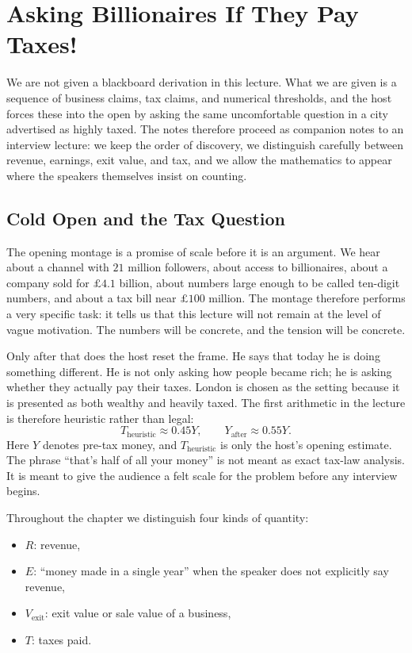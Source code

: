 \chapter{Asking Billionaires If They Pay Taxes!}

We are not given a blackboard derivation in this lecture. What we are given is a sequence of business claims, tax claims, and numerical thresholds, and the host forces these into the open by asking the same uncomfortable question in a city advertised as highly taxed. The notes therefore proceed as companion notes to an interview lecture: we keep the order of discovery, we distinguish carefully between revenue, earnings, exit value, and tax, and we allow the mathematics to appear where the speakers themselves insist on counting.

\section{Cold Open and the Tax Question}

The opening montage is a promise of scale before it is an argument. We hear about a channel with \(21\) million followers, about access to billionaires, about a company sold for \(\pounds 4.1\) billion, about numbers large enough to be called ten-digit numbers, and about a tax bill near \(\pounds 100\) million. The montage therefore performs a very specific task: it tells us that this lecture will not remain at the level of vague motivation. The numbers will be concrete, and the tension will be concrete.

Only after that does the host reset the frame. He says that today he is doing something different. He is not only asking how people became rich; he is asking whether they actually pay their taxes. London is chosen as the setting because it is presented as both wealthy and heavily taxed. The first arithmetic in the lecture is therefore heuristic rather than legal:
\begin{equation}
T_{\mathrm{heuristic}} \approx 0.45Y,
\qquad
Y_{\mathrm{after}} \approx 0.55Y.
\end{equation}
Here \(Y\) denotes pre-tax money, and \(T_{\mathrm{heuristic}}\) is only the host's opening estimate. The phrase ``that's half of all your money'' is not meant as exact tax-law analysis. It is meant to give the audience a felt scale for the problem before any interview begins.

\begin{definition}
Throughout the chapter we distinguish four kinds of quantity:
\begin{itemize}
\item \(R\): revenue,
\item \(E\): ``money made in a single year'' when the speaker does not explicitly say revenue,
\item \(V_{\mathrm{exit}}\): exit value or sale value of a business,
\item \(T\): taxes paid.
\end{itemize}
\end{definition}

